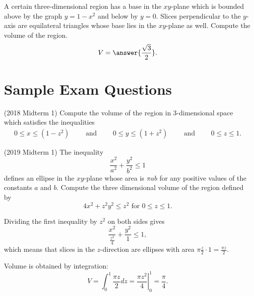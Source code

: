 \documentclass{ximera}
\begin{document}
\begin{exercise}
A certain three-dimensional region has a base in the $xy$-plane which is bounded above by the graph $y = 1-x^2$ and below by $y=0$. Slices perpendicular to the $y$-axis are equilateral triangles whose base lies in the $xy$-plane as well. Compute the volume of the region.
\[ V = \answer{\frac{\sqrt{3}}{2}}. \]
\end{exercise}

\section*{Sample Exam Questions}

\begin{question}(2018 Midterm 1)
Compute the volume of the region in 3-dimensional space which satisfies the inequalities
\begin{align*} 
0 \leq   x \leq (1 - z^2) \qquad \mbox{ and } \qquad
0 \leq  y \leq (1 + z^2) \qquad \mbox{ and } \qquad 
0 \leq z \leq 1.
\end{align*}
\vspace{-12pt}
\begin{multipleChoice}
\end{multipleChoice}
\end{question}

\begin{question}(2019 Midterm 1)
The inequality 
\[ \frac{x^2}{a^2} + \frac{y^2}{b^2} \leq 1 \]
defines an ellipse in the $xy$-plane whose area is $\pi a b$ for any positive values of the constants $a$ and $b$.  Compute the three dimensional volume of the region defined by
\[ 4 x^2 + z^2 y^2 \leq z^2 \mbox{ for } 0 \leq z \leq 1. \]
\begin{multipleChoice}
\choice{$4 \pi$}
\choice{$\displaystyle {\pi}$}
\end{multipleChoice}
\begin{feedback}
Dividing the first inequality by $z^2$ on both sides gives
\[ \frac{x^2}{\frac{z^2}{4}} + \frac{y^2}{1} \leq 1, \]
which means that slices in the $z$-direction are ellipses with area $\pi \frac{z}{2} \cdot 1 = \frac{\pi z}{2}$. 
\end{feedback}
\begin{feedback}
Volume is obtained by integration:
\[ V = \int_0^1 \frac{\pi z}{2} dz = \left. \frac{\pi z^2}{4} \right|_{0}^1 = \frac{\pi}{4}. \]
\end{feedback}
\end{question}
\end{document}
